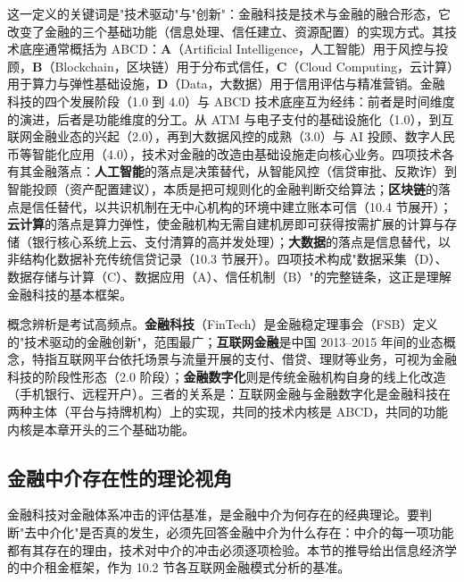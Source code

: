 这一定义的关键词是"技术驱动"与"创新"：金融科技是技术与金融的融合形态，它改变了金融的三个基础功能（信息处理、信任建立、资源配置）的实现方式。其技术底座通常概括为 ABCD：\textbf{A}（Artificial Intelligence，人工智能）用于风控与投顾，\textbf{B}（Blockchain，区块链）用于分布式信任，\textbf{C}（Cloud Computing，云计算）用于算力与弹性基础设施，\textbf{D}（Data，大数据）用于信用评估与精准营销。金融科技的四个发展阶段（1.0 到 4.0）与 ABCD 技术底座互为经纬：前者是时间维度的演进，后者是功能维度的分工。从 ATM 与电子支付的基础设施化（1.0），到互联网金融业态的兴起（2.0），再到大数据风控的成熟（3.0）与 AI 投顾、数字人民币等智能化应用（4.0），技术对金融的改造由基础设施走向核心业务。四项技术各有其金融落点：\textbf{人工智能}的落点是决策替代，从智能风控（信贷审批、反欺诈）到智能投顾（资产配置建议），本质是把可规则化的金融判断交给算法；\textbf{区块链}的落点是信任替代，以共识机制在无中心机构的环境中建立账本可信（10.4 节展开）；\textbf{云计算}的落点是算力弹性，使金融机构无需自建机房即可获得按需扩展的计算与存储（银行核心系统上云、支付清算的高并发处理）；\textbf{大数据}的落点是信息替代，以非结构化数据补充传统信贷记录（10.3 节展开）。四项技术构成"数据采集（D）、数据存储与计算（C）、数据应用（A）、信任机制（B）"的完整链条，这正是理解金融科技的基本框架。

概念辨析是考试高频点。\textbf{金融科技}（FinTech）是金融稳定理事会（FSB）定义的"技术驱动的金融创新"，范围最广；\textbf{互联网金融}是中国 2013--2015 年间的业态概念，特指互联网平台依托场景与流量开展的支付、借贷、理财等业务，可视为金融科技的阶段性形态（2.0 阶段）；\textbf{金融数字化}则是传统金融机构自身的线上化改造（手机银行、远程开户）。三者的关系是：互联网金融与金融数字化是金融科技在两种主体（平台与持牌机构）上的实现，共同的技术内核是 ABCD，共同的功能内核是本章开头的三个基础功能。

\subsection{金融中介存在性的理论视角}

金融科技对金融体系冲击的评估基准，是金融中介为何存在的经典理论。要判断"去中介化"是否真的发生，必须先回答金融中介为什么存在：中介的每一项功能都有其存在的理由，技术对中介的冲击必须逐项检验。本节的推导给出信息经济学的中介租金框架，作为 10.2 节各互联网金融模式分析的基准。

